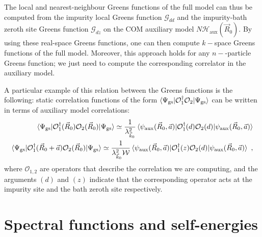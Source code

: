 \documentclass{report}
\numberwithin{equation}{section}
\begin{document}
The local and nearest-neighbour Greens functions of the full model can thus be computed from the impurity local Greens function \(\mathcal{G}_{dd}\) and the impurity-bath zeroth site Greens function \(\mathcal{G}_{dz}\) on the COM auxiliary model \(N \mathcal{H}_\text{aux}(\vec R_0)\). By using these real-space Greens functions, one can then compute \(k-\)space Greens functions of the full model. Moreover, this approach holds for any \(n-\)-particle Greens function; we just need to compute the corresponding correlator in the auxiliary model.

A particular example of this relation between the Greens functions is the following: static correlation functions of the form \(\braket{\Psi_\text{gs} | \mathcal{O}_1^\dagger \mathcal{O}_2 | \Psi_\text{gs}}\) can be written in terms of auxiliary model correlations:
\begin{equation}\begin{aligned}
	\braket{\Psi_\text{gs} | \mathcal{O}_1^\dagger(\vec R_0) \mathcal{O}_2(\vec R_0) | \Psi_\text{gs}} \simeq \frac{1}{\lambda_{\vec k_0}^2}\braket{\psi_\text{aux}(\vec R_0, \vec a) | \mathcal{O}_1^\dagger(d) \mathcal{O}_2(d) | \psi_\text{aux}(\vec R_0, \vec a)}\\
	\braket{\Psi_\text{gs} | \mathcal{O}_1^\dagger(\vec R_0 + \vec a) \mathcal{O}_2(\vec R_0) | \Psi_\text{gs}} \simeq \frac{1}{\lambda_{\vec k_0}^2 \mathcal{W}}\braket{\psi_\text{aux}(\vec R_0, \vec a) | \mathcal{O}_1^\dagger(z) \mathcal{O}_2(d) | \psi_\text{aux}(\vec R_0, \vec a)}~,
\end{aligned}\end{equation}
where \(\mathcal{O}_{1,2}\) are operators that describe the correlation we are computing, and the arguments \((d)\) and \((z)\) indicate that the corresponding operator acts at the impurity site and the bath zeroth site respectively.

\section{Spectral functions and self-energies}
\end{document}
